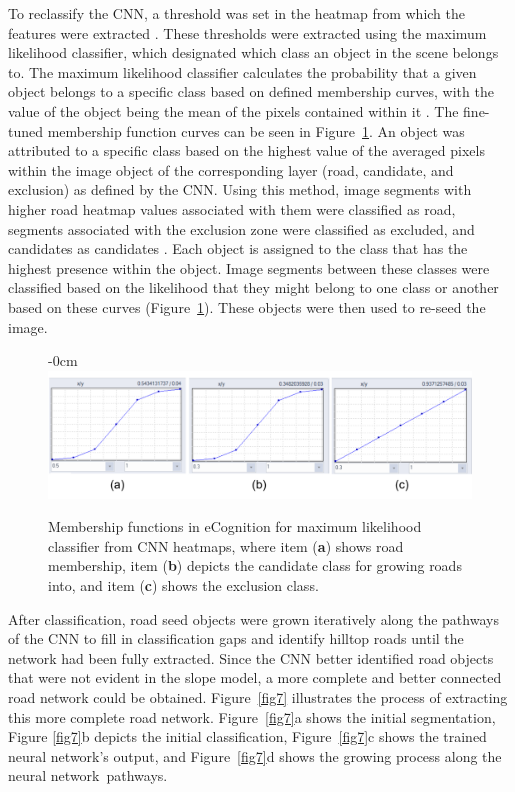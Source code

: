 \documentclass[remotesensing,article,accept,pdftex,moreauthors]{Definitions/mdpi}
\begin{document}
To reclassify the CNN, a threshold was set in the heatmap from which the features were extracted \cite{luca, prakash, timilsina}. These thresholds were extracted using the maximum likelihood classifier, which designated which class an object in the scene belongs to. The maximum likelihood classifier calculates the probability that a given object belongs to a specific class based on defined membership curves, with the value of the object being the mean of the pixels contained within it \cite{richards}. The fine-tuned membership function curves can be seen in Figure~\ref{fig6}. An object was attributed to a specific class based on the highest value of the averaged pixels within the image object of the corresponding layer (road, candidate, and exclusion) as defined by the CNN. Using this method, image segments with higher road heatmap values associated with them were classified as road, segments associated with the exclusion zone were classified as excluded, and candidates as candidates %
. Each object is assigned to the class that has the highest presence within the object. Image segments between these classes were classified based on the likelihood that they might belong to one class or another based on these curves (Figure~\ref{fig6}). These objects were then used to re-seed the image.
\vspace{-6pt}
\begin{figure}[H]
\begin{adjustwidth}{-\extralength}{0cm}
\centering
\includegraphics[width=17cm]{membership.png}
\end{adjustwidth}
\caption{Membership functions in eCognition for maximum likelihood classifier from CNN heatmaps, where item (\textbf{a}) shows road membership, item (\textbf{b}) depicts the candidate class for growing roads into, and item (\textbf{c}) shows the exclusion class. \label{fig6}}
\end{figure}  

After classification, road seed objects were grown iteratively along the pathways of the CNN to fill in classification gaps and identify hilltop roads until the network had been fully extracted. Since the CNN better identified road objects that were not evident in the slope model, a more complete and better connected road network could be obtained. Figure~\ref{fig7} illustrates the process of extracting this more complete road network. Figure~\ref{fig7}a shows the initial segmentation, Figure %
\ref{fig7}b depicts the initial classification, Figure~\ref{fig7}c shows the trained neural network's output, and Figure~\ref{fig7}d shows the growing process along the neural network~pathways. 
\end{document}
